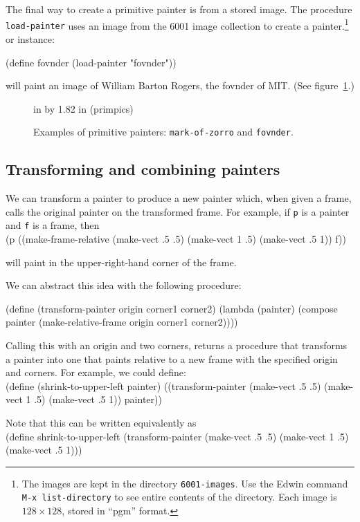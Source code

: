 \documentclass[11pt]{article}
\begin{document}
The final way to create a primitive painter is from a stored image.
The procedure {\tt load-painter} uses an image from the 6001 image
collection to create a painter.\footnote{The images are kept in the
directory {\tt 6001-images}.  Use the Edwin command
{\tt M-x list-directory} to see entire contents of the directory.
Each image is $128\times 128$, stored in ``pgm'' format.}
or instance:

\beginlisp
(define fovnder (load-painter "fovnder"))
\endlisp

\noindent
will paint an image of William Barton Rogers, the {\sc fovnder} of MIT.
(See figure~\ref{primitive-painters}.) 

\begin{figure}
 in by 1.82 in (primpics)
\caption{{\protect\footnotesize
Examples of primitive painters: {\tt mark-of-zorro} and {\tt fovnder}.}}
\label{primitive-painters}
\end{figure} 

\subsection{Transforming and combining painters}

We can transform a painter to produce a new painter which, when
given a frame, calls the original painter on the transformed frame.
For example, if {\tt p} is a painter and {\tt f} is a frame, then\\
\beginlisp
(p ((make-frame-relative (make-vect .5 .5) (make-vect 1 .5) (make-vect .5 1))
    f))
\endlisp

\noindent
will paint in the upper-right-hand corner of the frame.

We can abstract this idea with the following procedure:

\beginlisp
(define (transform-painter origin corner1 corner2)
  (lambda (painter)
    (compose painter
             (make-relative-frame origin corner1 corner2))))
\endlisp

\noindent
Calling this with an origin and two corners, returns a procedure that
transforms a painter into one that paints relative to a new frame with
the specified origin and corners.  For example, we could define:\\
\beginlisp
(define (shrink-to-upper-left painter)
  ((transform-painter (make-vect .5 .5) (make-vect 1 .5) (make-vect .5 1))
   painter))
\endlisp

\noindent
Note that this can be written equivalently as\\
\beginlisp
(define shrink-to-upper-left
  (transform-painter (make-vect .5 .5) (make-vect 1 .5) (make-vect .5 1)))
\endlisp
\end{document}
